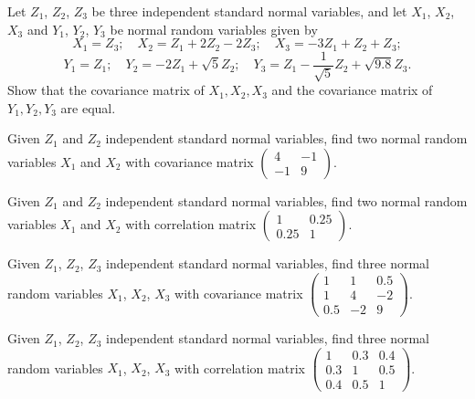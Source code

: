 \begin{exercises}
\item Let $Z_1$, $Z_2$, $Z_3$ be three independent standard normal variables, and let
$X_1$, $X_2$, $X_3$ and $Y_1$, $Y_2$, $Y_3$ be normal random variables given by
\[
X_1 = Z_3; \quad X_2 = Z_1 + 2Z_2 - 2Z_3; \quad X_3 = -3Z_1 + Z_2 + Z_3;
\]
\[
Y_1 = Z_1; \quad Y_2 = -2Z_1 + \sqrt{5}Z_2; \quad Y_3 = Z_1 - \frac{1}{\sqrt{5}}Z_2 +
\sqrt{9.8}Z_3.
\]
Show that the covariance matrix of $X_1, X_2, X_3$ and the covariance matrix of $Y_1,
Y_2, Y_3$ are equal.

\item Given $Z_1$ and $Z_2$ independent standard normal variables, find two normal
random variables $X_1$ and $X_2$ with covariance matrix
$\begin{pmatrix} 4 & -1 \\ -1 & 9 \end{pmatrix}$.

\item Given $Z_1$ and $Z_2$ independent standard normal variables, find two normal
random variables $X_1$ and $X_2$ with correlation matrix
$\begin{pmatrix} 1 & 0.25 \\ 0.25 & 1 \end{pmatrix}$.

\item Given $Z_1$, $Z_2$, $Z_3$ independent standard normal variables, find three normal
random variables $X_1$, $X_2$, $X_3$ with covariance matrix
$\begin{pmatrix} 1 & 1 & 0.5 \\ 1 & 4 & -2 \\ 0.5 & -2 & 9 \end{pmatrix}$.

\item Given $Z_1$, $Z_2$, $Z_3$ independent standard normal variables, find three normal
random variables $X_1$, $X_2$, $X_3$ with correlation matrix
$\begin{pmatrix} 1 & 0.3 & 0.4 \\ 0.3 & 1 & 0.5 \\ 0.4 & 0.5 & 1 \end{pmatrix}$.

\end{exercises}
